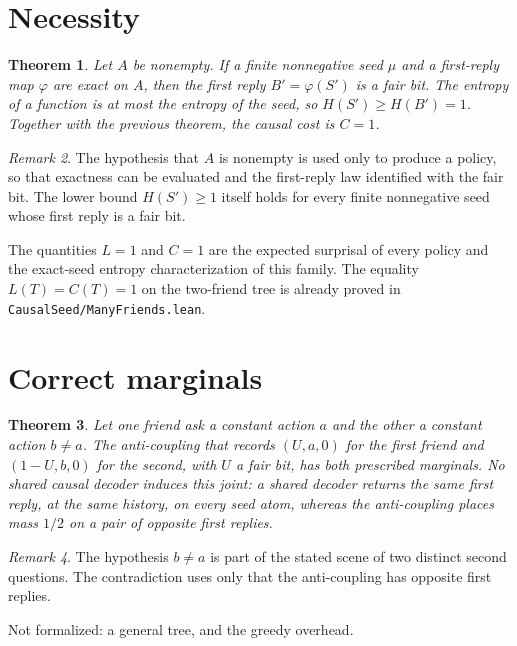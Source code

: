 \documentclass[11pt,a4paper]{article}
\newtheorem{theorem}{Theorem}
\theoremstyle{definition}
\theoremstyle{remark}
\newtheorem{remark}[theorem]{Remark}
\begin{document}
\section{Necessity}

\begin{theorem}
Let \(A\) be nonempty. If a finite nonnegative seed \(\mu\) and a first-reply
map \(\varphi\) are exact on \(A\), then the first reply \(B'=\varphi(S')\) is a
fair bit. The entropy of a function is at most the entropy of the seed, so
\(H(S')\ge H(B')=1\). Together with the previous theorem, the causal cost is
\(C=1\).
\end{theorem}

\begin{remark}
The hypothesis that \(A\) is nonempty is used only to produce a policy, so that
exactness can be evaluated and the first-reply law identified with the fair bit.
The lower bound \(H(S')\ge 1\) itself holds for every finite nonnegative seed
whose first reply is a fair bit.
\end{remark}

The quantities \(L=1\) and \(C=1\) are the expected surprisal of every policy
and the exact-seed entropy characterization of this family. The equality
\(L(T)=C(T)=1\) on the two-friend tree is already proved in
\texttt{CausalSeed/ManyFriends.lean}.

\section{Correct marginals}

\begin{theorem}
Let one friend ask a constant action \(a\) and the other a constant action
\(b\neq a\). The anti-coupling that records \((U,a,0)\) for the first friend and
\((1-U,b,0)\) for the second, with \(U\) a fair bit, has both prescribed
marginals. No shared causal decoder induces this joint: a shared decoder returns
the same first reply, at the same history, on every seed atom, whereas the
anti-coupling places mass \(1/2\) on a pair of opposite first replies.
\end{theorem}

\begin{remark}
The hypothesis \(b\neq a\) is part of the stated scene of two distinct second
questions. The contradiction uses only that the anti-coupling has opposite first
replies.
\end{remark}

Not formalized: a general tree, and the greedy overhead.
\end{document}
